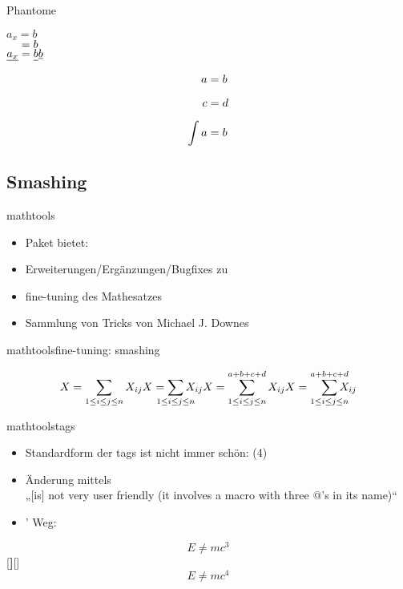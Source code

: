 \documentclass[
	vorläufig=false,
	datum=2016-11-18,
	titel={Mathematiksatz II},
	web=false,
]{../tex/latexkurs-slides}
\begin{document}
\begin{frame}[fragile]{Phantome}
\begin{LTXexample}[width=.4\textwidth]
$a_x = b$\\
$\hphantom{a_x} = b$\\
$\underline{a_x} = \underline{b\vphantom{a_x}}\underline b$
\end{LTXexample}
\begin{LTXexample}
\begin{align*}
a &= b\\
\vphantom{\int} c &= d\\
\int a &= b
\end{align*}
\end{LTXexample}
\end{frame}


\subsection{Smashing}
\begin{frame}{mathtools}
\begin{itemize}
\item Paket  bietet:
\item Erweiterungen/Ergänzungen/Bugfixes zu 
\item fine-tuning des Mathesatzes
\item Sammlung von Tricks von Michael J. Downes
\end{itemize}
\end{frame}

\begin{frame}[fragile]{mathtools}{fine-tuning: smashing}
\begin{LTXexample}[pos=t]
\[X = \sum_{1\le i\le j\le n} X_{ij}
X = \sum_{\mathclap{1\le i\le j\le n}} X_{ij}
X = \sum_{\mathclap{1\le i\le j\le n}}^{a+b+c+d} X_{ij}
X = \smashoperator[r]{\sum_{1\le i\le j\le n}^{a+b+c+d}} X_{ij}
\]
\end{LTXexample}
\end{frame}

\begin{frame}[fragile]{mathtools}{tags}
\begin{itemize}
\item Standardform der tags ist nicht immer schön: (4)
\item Änderung mittels \\%
„[is] not very user friendly (it involves a macro with three @’s in its name)“
\item {}’ Weg:
\end{itemize} 
\begin{LTXexample}[width=.3\textwidth]
\begin{equation}E \neq mc^3\end{equation}
[\textbf]{[}{]}
\begin{equation}E \neq mc^4\end{equation}
\end{LTXexample}
\end{frame}
\end{document}
